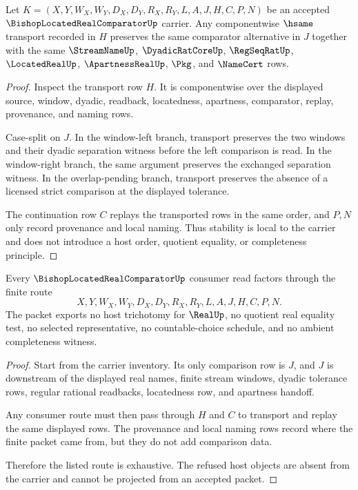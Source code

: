 \begin{theorem}
\label{thm:bishop-located-real-comparator-stability}
Let $K=(X,Y,W_X,W_Y,D_X,D_Y,R_X,R_Y,L,A,J,H,C,P,N)$ be an accepted $\BishopLocatedRealComparatorUp$ carrier. Any componentwise $\hsame$ transport recorded in $H$ preserves the same comparator alternative in $J$ together with the same $\StreamNameUp$, $\DyadicRatCoreUp$, $\RegSeqRatUp$, $\LocatedRealUp$, $\ApartnessRealUp$, $\Pkg$, and $\NameCert$ rows.
\end{theorem}
\begin{proof}
Inspect the transport row $H$. It is componentwise over the displayed source, window, dyadic, readback, locatedness, apartness, comparator, replay, provenance, and naming rows.

Case-split on $J$. In the window-left branch, transport preserves the two windows and their dyadic separation witness before the left comparison is read. In the window-right branch, the same argument preserves the exchanged separation witness. In the overlap-pending branch, transport preserves the absence of a licensed strict comparison at the displayed tolerance.

The continuation row $C$ replays the transported rows in the same order, and $P,N$ only record provenance and local naming. Thus stability is local to the carrier and does not introduce a host order, quotient equality, or completeness principle.
\end{proof}

\begin{theorem}
\label{thm:bishop-located-real-comparator-nonescape}
Every $\BishopLocatedRealComparatorUp$ consumer read factors through the finite route
$$
X,Y,W_X,W_Y,D_X,D_Y,R_X,R_Y,L,A,J,H,C,P,N.
$$
The packet exports no host trichotomy for $\RealUp$, no quotient real equality test, no selected representative, no countable-choice schedule, and no ambient completeness witness.
\end{theorem}
\begin{proof}
Start from the carrier inventory. Its only comparison row is $J$, and $J$ is downstream of the displayed real names, finite stream windows, dyadic tolerance rows, regular rational readbacks, locatedness row, and apartness handoff.

Any consumer route must then pass through $H$ and $C$ to transport and replay the same displayed rows. The provenance and local naming rows record where the finite packet came from, but they do not add comparison data.

Therefore the listed route is exhaustive. The refused host objects are absent from the carrier and cannot be projected from an accepted packet.
\end{proof}

